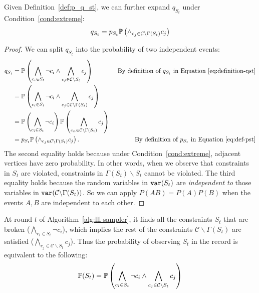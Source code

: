 \begin{lemma} \label{lem:recursion_start}
Given Definition~\ref{def:p_q_st}, we can further expand $q_{S_t}$ under Condition~\ref{cond:extreme}:
\begin{equation*}
q_{S_t}= p_{S_t}\mathbb{P} \left( \wedge_{c_j \in \mathcal{C}\backslash \Gamma(S_t)}c_j\right)
\end{equation*}
\begin{proof}
We can split $q_{S_t}$ into the probability of two independent events:
\begin{align*} 
    q_{S_t}&=\mathbb{P}\left(\bigwedge_{c_i \in S_t}\neg{c}_i \wedge \bigwedge_{c_j \in \mathcal{C}\backslash S_t}c_j\right) &\text{ By definition of $q_{S_t}$ in Equation~\eqref{eq:definition-qst}}\\
    &=\mathbb{P}\left(\bigwedge_{c_i \in S_t}\neg{c}_i \wedge \bigwedge_{c_j \in \mathcal{C}\backslash \Gamma(S_t)}c_j\right) \\
    &=\mathbb{P}\left(\bigwedge_{c_i \in S_t}\neg{c}_i\right) \mathbb{P} \left( \bigwedge_{c_n \in \mathcal{C}\backslash \Gamma(S_t)}c_j\right)\\
    &= p_{S_t}\mathbb{P} \left( \wedge_{c_j \in \mathcal{C}\backslash \Gamma(S_t)}c_j\right). &\text{ By definition of $p_{S_t}$ in Equation~\eqref{eq:def-pst}}
\end{align*}
The second equality holds because under  Condition~\ref{cond:extreme}, adjacent vertices have zero probability. In other words, when we observe that constraints in $S_t$ are violated, constraints in $\Gamma(S_t)\backslash S_t$ cannot be violated. The third equality holds because the random variables in $\mathtt{var}(S_t)$ are \textit{independent to} 
those variables in $\mathtt{var}(\mathcal{C}\backslash\Gamma(S_t))$. {So we can apply $P(AB)=P(A)P(B)$ when the events $A,B$  are independent to each other.}
\end{proof}
\end{lemma}

\begin{remark} \label{rem:equal}
At round $t$ of Algorithm~\ref{alg:lll-sampler},  it finds all the constraints $S_t$ that are broken ($\bigwedge_{c_i \in S_t}\neg{c}_i $), which implies the rest of the constraints $\mathcal{C}\backslash \Gamma(S_t)$ are satisfied ($\bigwedge_{c_j \in \mathcal{C}\backslash S_t}c_j$). Thus the probability of observing $S_t$ in the record is equivalent to the following:
\begin{align} \label{eq:st-expand}
\mathbb{P}(S_t)=\mathbb{P}\left(\bigwedge_{c_i \in S_t}\neg{c}_i \wedge \bigwedge_{c_j \in \mathcal{C}\backslash S_t}c_j\right)
\end{align}
\end{remark}

